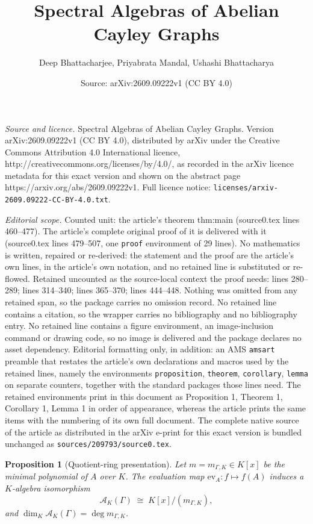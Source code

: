 \documentclass[10pt,a4paper]{amsart}
\title{Spectral Algebras of Abelian Cayley Graphs}
\author{Deep Bhattacharjee, Priyabrata Mandal, Ushashi Bhattacharya}
\date{Source: arXiv:2609.09222v1 (CC BY 4.0)}
\newtheorem{proposition}{Proposition}
\newcommand{\calA}{\mathcal{A}}
\begin{document}
\maketitle

\noindent\emph{Source and licence.} Spectral Algebras of Abelian Cayley Graphs. Version arXiv:2609.09222v1 (CC BY 4.0), distributed by arXiv under the Creative Commons Attribution 4.0 International licence, http://creativecommons.org/licenses/by/4.0/, as recorded in the arXiv licence metadata for this exact version and shown on the abstract page https://arxiv.org/abs/2609.09222v1. Full licence notice: \texttt{licenses/arxiv-2609.09222-CC-BY-4.0.txt}.\par\smallskip

\noindent\textit{Editorial scope.} Counted unit: the article's theorem thm:main (source0.tex lines 460--477). The article's complete original proof of it is delivered with it (source0.tex lines 479--507, one \texttt{proof} environment of 29 lines). No mathematics is written, repaired or re-derived: the statement and the proof are the article's own lines, in the article's own notation, and no retained line is substituted or re-flowed.  Retained uncounted as the source-local context the proof needs: lines 280--289; lines 314--340; lines 365--370; lines 444--448.  Nothing was omitted from any retained span, so the package carries no omission record.  No retained line contains a citation, so the wrapper carries no bibliography and no bibliography entry.  No retained line contains a figure environment, an image-inclusion command or drawing code, so no image is delivered and the package declares no asset dependency.  Editorial formatting only, in addition: an AMS \texttt{amsart} preamble that restates the article's own declarations and macros used by the retained lines, namely the environments \texttt{proposition}, \texttt{theorem}, \texttt{corollary}, \texttt{lemma} on separate counters, together with the standard packages those lines need.  The retained environments print in this document as Proposition 1, Theorem 1, Corollary 1, Lemma 1 in order of appearance, whereas the article prints the same items with the numbering of its own full document.  The complete native source of the article as distributed in the arXiv e-print for this exact version is bundled unchanged as \texttt{sources/209793/source0.tex}.
\begin{proposition}[Quotient-ring presentation]
\label{prop:quotient}
Let $m = m_{\Gamma,K} \in K[x]$ be the minimal polynomial of $A$ over $K$.
The evaluation map $\mathrm{ev}_A : f \mapsto f(A)$ induces a $K$-algebra
isomorphism
\[
  \calA_K(\Gamma) \;\cong\; K[x]/(m_{\Gamma,K}),
\]
and $\dim_K \calA_K(\Gamma) = \deg m_{\Gamma,K}$.
\end{proposition}
\end{document}
